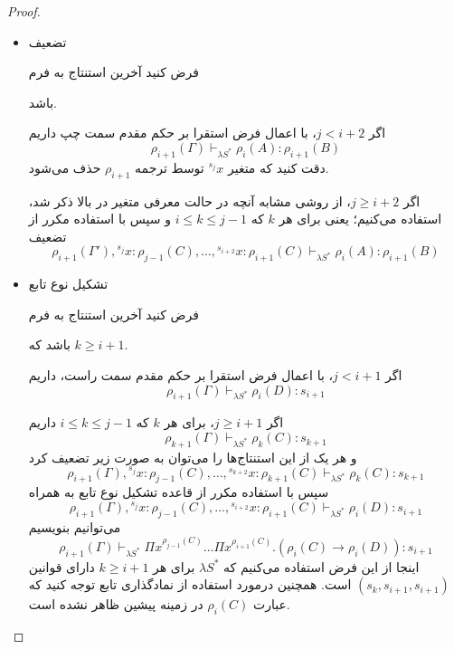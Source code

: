 \begin{proof}
\begin{itemize}
\item تضعیف

فرض کنید آخرین استنتاج به فرم
\begin{prooftree}
\end{prooftree}
باشد.

اگر
$j < i + 2$،
با اعمال فرض استقرا بر حکم مقدم سمت چپ داریم
\begin{equation*}
\rho_{i+1}(\Gamma) \vdash_{\lambda S^*} \rho_i(A) : \rho_{i+1}(B)
\end{equation*}
دقت کنید که متغیر
${}^{s_j}x$
توسط ترجمه
$\rho_{i+1}$
حذف می‌شود.

اگر
$j \ge i + 2$،
از روشی مشابه آنچه در حالت معرفی متغیر در بالا ذکر شد، استفاده می‌کنیم؛ یعنی برای هر
$k$
که
$i \le k \le j - 1$
و سپس با استفاده مکرر از تضعیف
\begin{equation*}
\rho_{i+1}(\Gamma'), {}^{s_j}x:\rho_{j-1}(C), \dots, {}^{s_{i+2}}x:\rho_{i+1}(C) \vdash_{\lambda S^*} \rho_i(A) : \rho_{i+1}(B)
\end{equation*}

\item تشکیل نوع تابع

فرض کنید آخرین استنتاج به فرم
\begin{prooftree}
\end{prooftree}
باشد که
$k \ge i + 1$.

اگر
$j < i + 1$،
با اعمال فرض استقرا بر حکم مقدم سمت راست، داریم
\begin{equation*}
\rho_{i+1}(\Gamma) \vdash_{\lambda S^*} \rho_i(D) : s_{i + 1}
\end{equation*}

اگر
$j \ge i + 1$،
برای هر
$k$
که
$i \le k \le j - 1$
داریم
\begin{equation*}
\rho_{k+1}(\Gamma) \vdash_{\lambda S^*} \rho_k(C) : s_{k + 1}
\end{equation*}
و هر یک از این استنتاج‌ها را می‌توان به صورت زیر تضعیف کرد
\begin{equation*}
\rho_{i+1}(\Gamma), {}^{s_j}x:\rho_{j-1}(C), \dots, {}^{s_{k+2}}x:\rho_{k+1}(C) \vdash_{\lambda S^*} \rho_k(C) : s_{k+1}
\end{equation*}
سپس با استفاده مکرر از قاعده تشکیل نوع تابع به همراه
\begin{equation*}
\rho_{i+1}(\Gamma), {}^{s_j}x:\rho_{j-1}(C), \dots, {}^{s_{i+2}}x:\rho_{i+1}(C) \vdash_{\lambda S^*} \rho_i(D) : s_{i+1}
\end{equation*}
می‌توانیم بنویسیم
\begin{equation*}
\rho_{i+1}(\Gamma) \vdash_{\lambda S^*} \Pi x^{\rho_{j-1}(C)} \dots \Pi x^{\rho_{i+1}(C)}.(\rho_i(C) \rightarrow \rho_i(D)) : s_{i+1}
\end{equation*}
اینجا از این فرض استفاده می‌کنیم که
$\lambda S^*$
برای هر
$k \ge i + 1$
دارای قوانین
$(s_k,s_{i+1},s_{i+1})$
است.
همچنین درمورد استفاده از نمادگذاری تابع توجه کنید که عبارت
$\rho_i(C)$
در زمینه پیشین ظاهر نشده است.


\end{itemize}
\end{proof}
